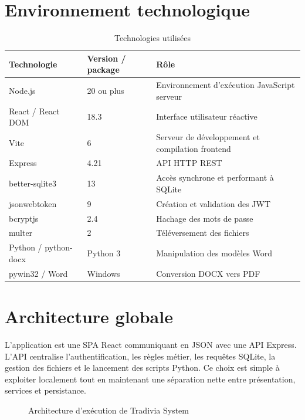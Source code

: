 \documentclass[12pt,a4paper,oneside]{report}
\newcommand{\code}[1]{\texttt{#1}}
\begin{document}
\section{Environnement technologique}
\begin{table}[H]\centering
\caption{Technologies utilisées}
\begin{tabularx}{\textwidth}{p{3.5cm}p{3cm}Y}
\toprule \textbf{Technologie} & \textbf{Version / package} & \textbf{Rôle}\\ \midrule
Node.js & 20 ou plus & Environnement d'exécution JavaScript serveur\\
React / React DOM & 18.3 & Interface utilisateur réactive\\
Vite & 6 & Serveur de développement et compilation frontend\\
Express & 4.21 & API HTTP REST\\
better-sqlite3 & 13 & Accès synchrone et performant à SQLite\\
jsonwebtoken & 9 & Création et validation des JWT\\
bcryptjs & 2.4 & Hachage des mots de passe\\
multer & 2 & Téléversement des fichiers\\
Python / python-docx & Python 3 & Manipulation des modèles Word\\
pywin32 / Word & Windows & Conversion DOCX vers PDF\\
\bottomrule
\end{tabularx}
\end{table}

\section{Architecture globale}
L'application est une SPA React communiquant en JSON avec une API Express. L'API centralise l'authentification, les règles métier, les requêtes SQLite, la gestion des fichiers et le lancement des scripts Python. Ce choix est simple à exploiter localement tout en maintenant une séparation nette entre présentation, services et persistance.

\begin{figure}[H]\centering
{}
\caption{Architecture d'exécution de Tradivia System}
\end{figure}
\end{document}
